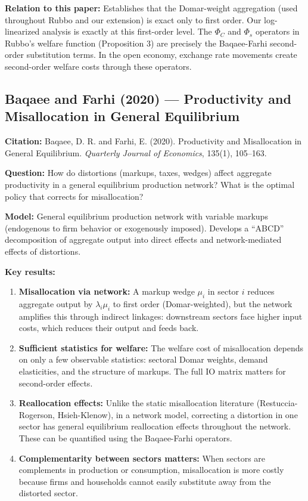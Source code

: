\documentclass[12pt]{article}
\begin{document}
\textbf{Relation to this paper:} Establishes that the Domar-weight aggregation (used throughout Rubbo and our extension) is exact only to first order. Our log-linearized analysis is exactly at this first-order level. The $\Phi_C$ and $\Phi_s$ operators in Rubbo's welfare function (Proposition 3) are precisely the Baqaee-Farhi second-order substitution terms. In the open economy, exchange rate movements create second-order welfare costs through these operators.

\subsection{Baqaee and Farhi (2020) --- Productivity and Misallocation in General Equilibrium}

\textbf{Citation:} Baqaee, D. R. and Farhi, E. (2020). Productivity and Misallocation in General Equilibrium. \textit{Quarterly Journal of Economics}, 135(1), 105--163.

\textbf{Question:} How do distortions (markups, taxes, wedges) affect aggregate productivity in a general equilibrium production network? What is the optimal policy that corrects for misallocation?

\textbf{Model:} General equilibrium production network with variable markups (endogenous to firm behavior or exogenously imposed). Develops a ``ABCD'' decomposition of aggregate output into direct effects and network-mediated effects of distortions.

\textbf{Key results:}
\begin{enumerate}
    \item \textbf{Misallocation via network:} A markup wedge $\mu_i$ in sector $i$ reduces aggregate output by $\lambda_i \mu_i$ to first order (Domar-weighted), but the network amplifies this through indirect linkages: downstream sectors face higher input costs, which reduces their output and feeds back.
    \item \textbf{Sufficient statistics for welfare:} The welfare cost of misallocation depends on only a few observable statistics: sectoral Domar weights, demand elasticities, and the structure of markups. The full IO matrix matters for second-order effects.
    \item \textbf{Reallocation effects:} Unlike the static misallocation literature (Restuccia-Rogerson, Hsieh-Klenow), in a network model, correcting a distortion in one sector has general equilibrium reallocation effects throughout the network. These can be quantified using the Baqaee-Farhi operators.
    \item \textbf{Complementarity between sectors matters:} When sectors are complements in production or consumption, misallocation is more costly because firms and households cannot easily substitute away from the distorted sector.
\end{enumerate}
\end{document}

